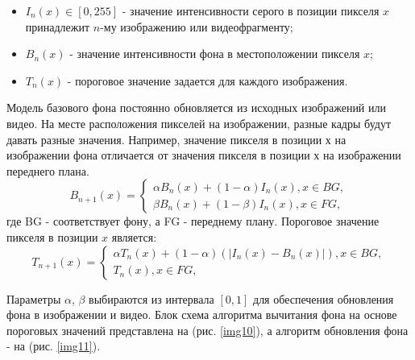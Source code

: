 \begin{itemize}
	\item $I_n\left(x\right) \in \left[0,255\right]$  - значение интенсивности серого в позиции пикселя $x$ принадлежит $n$-му изображению или видеофрагменту;
	\item $B_n \left(x\right)$  - значение интенсивности фона в местоположении пикселя $x$;
	\item $T_n \left(x\right)$  - пороговое значение задается для каждого изображения. 
\end{itemize}
Модель базового фона постоянно обновляется из исходных изображений или видео. На месте расположения пикселей на изображении, разные кадры будут давать разные значения. Например, значение пикселя в позиции х на изображении фона отличается от значения пикселя в позиции х на изображении переднего плана.
\begin{equation}\label{eq9}
B_{n+1}\left(x\right)= \left\{\begin{array}{l} \alpha B_n\left(x\right)+\left(1-\alpha\right)I_n\left(x\right),x\in BG,\\
\beta B_n\left(x\right)+\left(1-\beta\right)I_n\left(x\right),x\in FG,
\end{array}\right.
\end{equation}
где BG - соответствует фону, а FG - переднему плану. Пороговое значение пикселя в позиции $x$ является:
\begin{equation}\label{eq10}
T_{n+1}\left(x\right)= \left\{\begin{array}{l} \alpha T_n \left(x\right)+\left(1-\alpha\right) \left(\left|I_n\left(x\right)-B_n\left(x\right)\right|\right), x \in BG,\\
T_n\left(x\right), x\in FG,
\end{array}\right.
\end{equation}

Параметры $\alpha$, $\beta$ выбираются из интервала $\left[0,1\right]$ для обеспечения обновления фона в изображении и видео. Блок схема алгоритма вычитания фона на основе пороговых значений представлена на (рис. \ref{img10}), а алгоритм обновления фона - на (рис. \ref{img11}).

